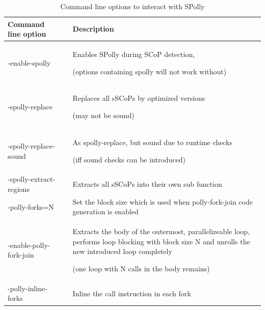 \begin{table}[htbp]
  \caption{Command line options to interact with SPolly}
  \begin{tabularx}{\textwidth}{ l p{1mm} X  }
    Command line option     && Description  \\
    \hline
    -enable-spolly          && Enables SPolly during SCoP detection,\par
                                (options containing spolly will not work without) \\ 
    -spolly-replace         && Replaces all sSCoPs by optimized versions \par 
                                (may not be sound)  \\
    -spolly-replace-sound   && As spolly-replace, but sound due to runtime checks \par
                                (iff sound checks can be introduced)\\
    -spolly-extract-regions && Extracts all sSCoPs into their own sub function \\
    -polly-forks=N          && Set the block size which is used when 
                             polly-fork-join code generation is enabled\\
    -enable-polly-fork-join && Extracts the body of the outermost,
                             parallelizeable loop, performs loop blocking with
                             block size N and unrolls the new introduced loop 
                             completely \par
                             (one loop with N calls in the body remains)\\
    -polly-inline-forks     && Inline the call instruction in each fork \\
  \end{tabularx}
  \label{tab:CommandLineOptions}
\end{table}

